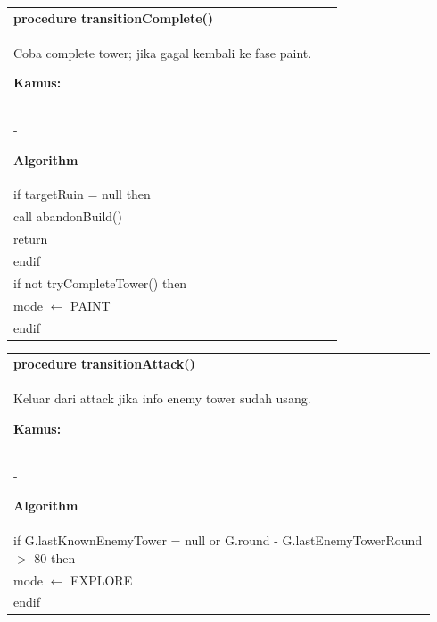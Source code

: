 \documentclass{article}
\newenvironment{pseudobox}
{
\centering
\begin{longtable}{|p{0.94\linewidth}|}
\hline
}
{
\\ \hline
\end{longtable}
\vspace{0.05cm}
}
\begin{document}
\begin{pseudobox}
\textbf{procedure transitionComplete()} \\
{ Coba complete tower; jika gagal kembali ke fase paint. }

\textbf{Kamus:} \\
\hspace*{1em} -

\textbf{Algorithm} \\
\hspace*{1em} if targetRuin = null then \\
\hspace*{2em} call abandonBuild() \\
\hspace*{2em} return \\
\hspace*{1em} endif \\

\hspace*{1em} if not tryCompleteTower() then \\
\hspace*{2em} mode $\leftarrow$ PAINT \\
\hspace*{1em} endif
\end{pseudobox}

\begin{pseudobox}
\textbf{procedure transitionAttack()} \\
{ Keluar dari attack jika info enemy tower sudah usang. }

\textbf{Kamus:} \\
\hspace*{1em} -

\textbf{Algorithm} \\
\hspace*{1em} if G.lastKnownEnemyTower = null or G.round - G.lastEnemyTowerRound $>$ 80 then \\
\hspace*{2em} mode $\leftarrow$ EXPLORE \\
\hspace*{1em} endif
\end{pseudobox}
\end{document}
